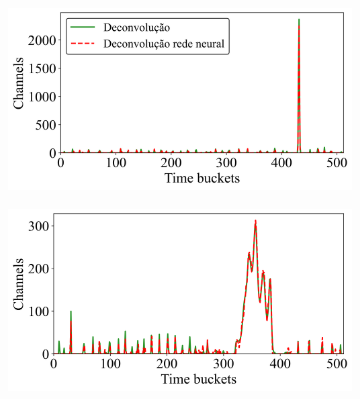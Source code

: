 \documentclass[a4paper,12pt,oneside]{book}
\begin{document}

\begin{figure}[H]
\centering
    \begin{subfigure}[b]{0.49\textwidth}
        \centering
        \includegraphics[scale=0.425]{figs/swbtd_1.png}
        \caption{}
        \label{subfig:std_ex1}
    \end{subfigure}%
    \hfill
    \begin{subfigure}[b]{0.465\textwidth}
        \centering
        \includegraphics[scale=0.425]{figs/swbtd_2.png}

\end{subfigure}
\end{figure}
\end{document}
